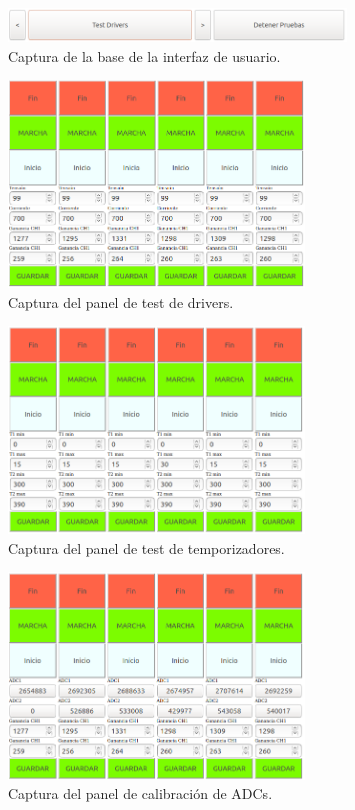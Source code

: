 \begin{figure}[H]
	\centering
	\includegraphics[width=0.8\textwidth]{./Figures/Base.png}
	\caption{Captura de la base de la interfaz de usuario.}
	\label{fig:Base}
\end{figure}

\begin{figure}[H]
	\centering
	\includegraphics[width=0.7\textwidth]{./Figures/PanelDriver.png}
	\caption{Captura del panel de test de drivers.}
	\label{fig:PanelDriver}
\end{figure}

\begin{figure}[H]
	\centering
	\includegraphics[width=0.7\textwidth]{./Figures/PanelTemp.png}
	\caption{Captura del panel de test de temporizadores.}
	\label{fig:PanelTemp}
\end{figure}

\begin{figure}[H]
	\centering
	\includegraphics[width=0.7\textwidth]{./Figures/PanelCal.png}
	\caption{Captura del panel de calibración de ADCs.}
	\label{fig:PanelCal}
\end{figure}
